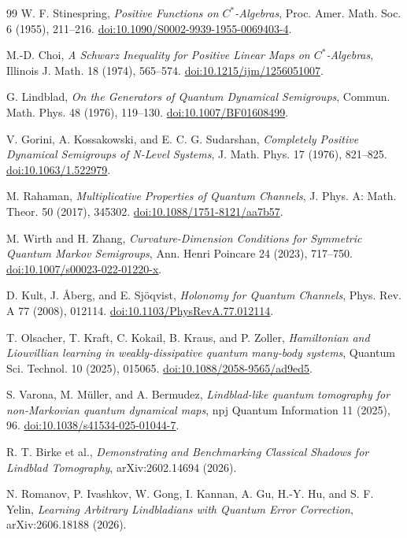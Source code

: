 \documentclass[11pt]{article}
\theoremstyle{definition}
\theoremstyle{remark}
\begin{document}
\appendix


\begin{thebibliography}{99}
W. F. Stinespring,
\emph{Positive Functions on $C^*$-Algebras},
Proc. Amer. Math. Soc. 6 (1955), 211--216.
\href{https://doi.org/10.1090/S0002-9939-1955-0069403-4}{doi:10.1090/S0002-9939-1955-0069403-4}.

M.-D. Choi,
\emph{A Schwarz Inequality for Positive Linear Maps on $C^*$-Algebras},
Illinois J. Math. 18 (1974), 565--574.
\href{https://doi.org/10.1215/ijm/1256051007}{doi:10.1215/ijm/1256051007}.

G. Lindblad,
\emph{On the Generators of Quantum Dynamical Semigroups},
Commun. Math. Phys. 48 (1976), 119--130.
\href{https://doi.org/10.1007/BF01608499}{doi:10.1007/BF01608499}.

V. Gorini, A. Kossakowski, and E. C. G. Sudarshan,
\emph{Completely Positive Dynamical Semigroups of N-Level Systems},
J. Math. Phys. 17 (1976), 821--825.
\href{https://doi.org/10.1063/1.522979}{doi:10.1063/1.522979}.

M. Rahaman,
\emph{Multiplicative Properties of Quantum Channels},
J. Phys. A: Math. Theor. 50 (2017), 345302.
\href{https://doi.org/10.1088/1751-8121/aa7b57}{doi:10.1088/1751-8121/aa7b57}.

M. Wirth and H. Zhang,
\emph{Curvature-Dimension Conditions for Symmetric Quantum Markov Semigroups},
Ann. Henri Poincare 24 (2023), 717--750.
\href{https://doi.org/10.1007/s00023-022-01220-x}{doi:10.1007/s00023-022-01220-x}.

D. Kult, J. {\AA}berg, and E. Sj\"oqvist,
\emph{Holonomy for Quantum Channels},
Phys. Rev. A 77 (2008), 012114.
\href{https://doi.org/10.1103/PhysRevA.77.012114}{doi:10.1103/PhysRevA.77.012114}.

T. Olsacher, T. Kraft, C. Kokail, B. Kraus, and P. Zoller,
\emph{Hamiltonian and Liouvillian learning in weakly-dissipative quantum many-body systems},
Quantum Sci. Technol. 10 (2025), 015065.
\href{https://doi.org/10.1088/2058-9565/ad9ed5}{doi:10.1088/2058-9565/ad9ed5}.

S. Varona, M. M\"uller, and A. Bermudez,
\emph{Lindblad-like quantum tomography for non-Markovian quantum dynamical maps},
npj Quantum Information 11 (2025), 96.
\href{https://doi.org/10.1038/s41534-025-01044-7}{doi:10.1038/s41534-025-01044-7}.

R. T. Birke et al.,
\emph{Demonstrating and Benchmarking Classical Shadows for Lindblad Tomography},
arXiv:2602.14694 (2026).

N. Romanov, P. Ivashkov, W. Gong, I. Kannan, A. Gu, H.-Y. Hu, and S. F. Yelin,
\emph{Learning Arbitrary Lindbladians with Quantum Error Correction},
arXiv:2606.18188 (2026).
\end{thebibliography}
\end{document}
